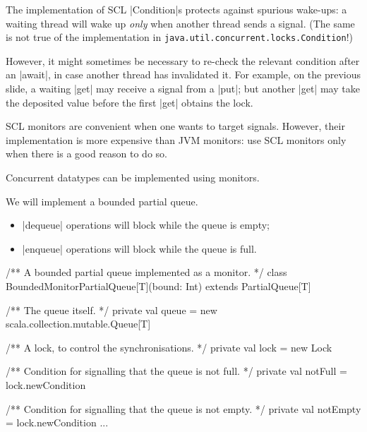 
\begin{slide}

The implementation of SCL |Condition|s protects against spurious
wake-ups: a waiting thread will wake up \emph{only} when another
thread sends a signal.  (The same is not true of the implementation in
\texttt{java.util.concurrent.locks.Condition}!)

However, it might sometimes be necessary to re-check the relevant
condition after an |await|, in case another thread has invalidated it.
For example, on the previous slide, a waiting |get| may receive a
signal from a |put|; but another |get| may take the deposited value
before the first |get| obtains the lock.
\end{slide}


\begin{slide}

SCL monitors are convenient when one wants to target signals.
However, their implementation is more expensive than JVM monitors: use
SCL monitors only when there is a good reason to do so.
\end{slide}



\begin{slide}

Concurrent datatypes can be implemented using monitors. 

We will implement a bounded partial queue.
%
\begin{itemize}
\item |dequeue| operations will block while the queue is empty;

\item |enqueue| operations will block while the queue is full.
\end{itemize}
\end{slide}


\begin{slide}

\begin{scala}
/** A bounded partial queue implemented as a monitor. */
class BoundedMonitorPartialQueue[T](bound: Int) extends PartialQueue[T]{
  /** The queue itself. */
  private val queue = new scala.collection.mutable.Queue[T]

  /** A lock, to control the synchronisations. */
  private val lock = new Lock

  /** Condition for signalling that the queue is not full. */
  private val notFull = lock.newCondition

  /** Condition for signalling that the queue is not empty. */
  private val notEmpty = lock.newCondition
  ...
}
\end{scala}
\end{slide}


